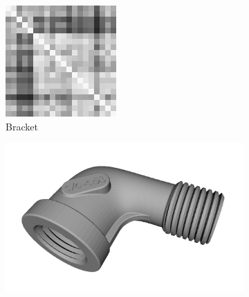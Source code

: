 \begin{figure}[ht]
\begin{subfigure}[b]{0.20\linewidth}
		\includegraphics[width=\linewidth]{fig/3dreg/reg3Dtrain_bracket.png} 
		\caption{Bracket}
	\end{subfigure}
	\begin{subfigure}[b]{0.20\linewidth}
		\includegraphics[width=\linewidth]{fig/3dreg/pipe.png} \\

\end{subfigure}
\end{figure}
